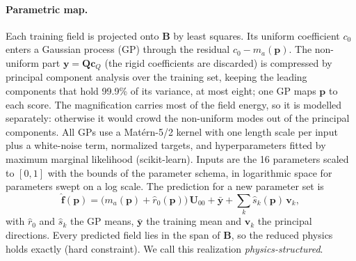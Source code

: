 \documentclass[11pt]{article}
\begin{document}
\paragraph{Parametric map.} Each training field is projected onto $\mathbf{B}$ by least squares. Its uniform coefficient
$c_0$ enters a Gaussian process (GP) through the residual $c_0-m_a(\mathbf{p})$. The non-uniform part
$\mathbf{y}=\mathbf{Q}\mathbf{c}_Q$ (the rigid coefficients are discarded) is compressed by principal component
analysis over the training set, keeping the leading components that hold 99.9\% of its variance, at most eight; one GP
maps $\mathbf{p}$ to each score. The magnification carries most of the field energy, so it is modelled separately:
otherwise it would crowd the non-uniform modes out of the principal components. All GPs use a Mat\'ern-5/2 kernel with
one length scale per input plus a white-noise term, normalized targets, and hyperparameters fitted by maximum marginal
likelihood (scikit-learn). Inputs are the 16 parameters scaled to $[0,1]$ with the bounds of the parameter schema,
in logarithmic space for parameters swept on a log scale. The prediction for a new parameter set is
\begin{equation}\label{eq:basispred}
  \hat{\mathbf{f}}(\mathbf{p}) = \bigl(m_a(\mathbf{p})+\hat r_0(\mathbf{p})\bigr)\,\mathbf{U}_{00}
     + \bar{\mathbf{y}} + \sum_{k} \hat s_k(\mathbf{p})\,\mathbf{v}_k ,
\end{equation}
with $\hat r_0$ and $\hat s_k$ the GP means, $\bar{\mathbf{y}}$ the training mean and $\mathbf{v}_k$ the principal
directions. Every predicted field lies in the span of $\mathbf{B}$, so the reduced physics holds exactly (hard
constraint). We call this realization \emph{physics-structured}.
\end{document}
